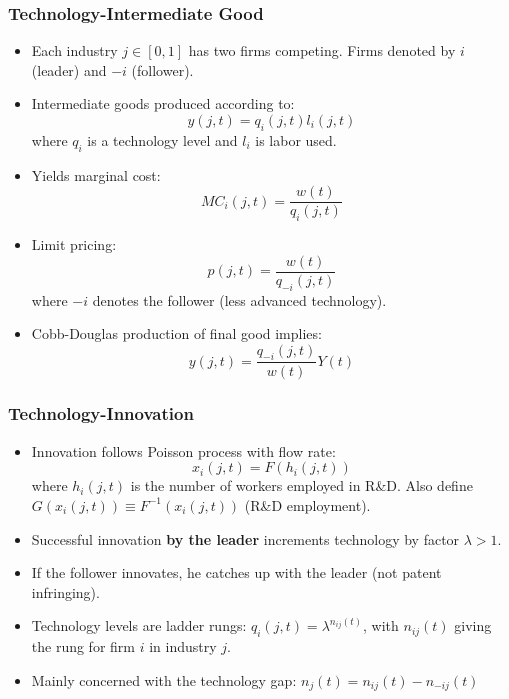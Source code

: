 \documentclass{beamer}
\begin{document}
\begin{frame}[t]\frametitle{Technology-Intermediate Good} 
  \begin{itemize}
    \item<+-> Each industry $j \in [0, 1]$ has two firms competing. Firms denoted by $i$ (leader) and $-i$ (follower).

    \item<+-> Intermediate goods produced according to:
      \begin{equation*} \label{eq:intermediate_production}
        y(j, t) = q_i(j, t)l_i(j, t)
      \end{equation*}
      where $q_i$ is a technology level and $l_i$ is labor used. 

    \item<+-> Yields marginal cost:
      \begin{equation*} \label{eq:marginal_cost}
        MC_i(j, t) = \frac{w(t)}{q_i(j, t)}
      \end{equation*}

    \item<+-> Limit pricing:
      \begin{equation*} \label{eq:limit_pricing}
        p(j, t) = \frac{w(t)}{q_{-i}(j, t)}      
      \end{equation*}
    where $-i$ denotes the follower (less advanced technology).
    \item<+-> Cobb-Douglas production of final good implies:
      \begin{equation*}
        y(j, t) = \frac{q_{-i}(j, t)}{w(t)}Y(t)
      \end{equation*}
  \end{itemize}
\end{frame}

\begin{frame}[t]\frametitle{Technology-Innovation} 
  \begin{itemize}
    \item<+-> Innovation follows Poisson process with flow rate:
      \begin{equation*} \label{eq:tech_rd_technology}
        x_i(j, t) = F(h_i(j, t))
      \end{equation*}
      where $h_i(j, t)$ is the number of workers employed in R\&D.
      Also define $G(x_i(j,t)) \equiv F^{-1}(x_i(j,t))$ (R\&D employment).
    \item<+-> Successful innovation \textbf{by the leader} increments technology by factor $\lambda > 1$.
    \item<+-> If the follower innovates, he catches up with the leader (not patent infringing).
    \item<+-> Technology levels are ladder rungs: $q_i(j, t) = \lambda^{n_{ij}(t)}$, with $n_{ij}(t)$ giving the rung for firm $i$ in industry $j$.
    \item<+-> Mainly concerned with the technology gap: $n_j(t) = n_{ij}(t) - n_{-ij}(t)$
  \end{itemize}
\end{frame}
\end{document}
